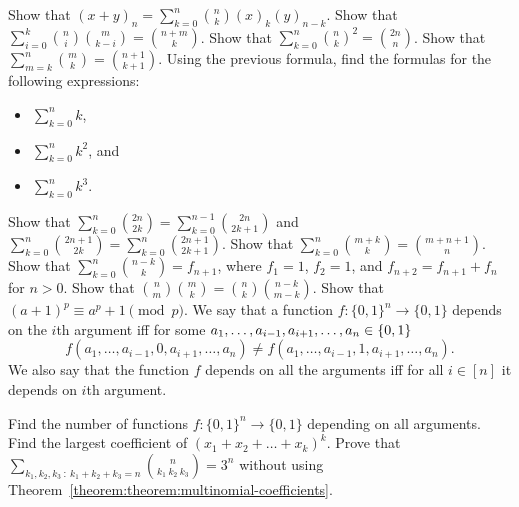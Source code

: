 \begin{chapterendexercises}
  \exercise Show that
    $(x + y)_n = \sum_{k = 0}^n \binom{n}{k} (x)_k (y)_{n - k}$.
  \exercise Show that
    $\sum_{i = 0}^k \binom{n}{i} \binom{m}{k - i} = \binom{n + m}{k}$.
  \exercise Show that
    $\sum_{k = 0}^n \binom{n}{k}^2 = \binom{2n}{n}$.
  \exercise Show that $\sum_{m = k}^n \binom{m}{k} =
    \binom{n + 1}{k + 1}$.
  \exercise Using the previous formula, find the formulas for the following
    expressions:
    \begin{itemize}
      \item $\sum_{k = 0}^n k$,
      \item $\sum_{k = 0}^n k^2$, and
      \item $\sum_{k = 0}^n k^3$.
    \end{itemize}
  \exercise Show that $\sum_{k = 0}^{n} \binom{2n}{2k} =
    \sum_{k = 0}^{n - 1} \binom{2n}{2k + 1}$ and
    $\sum_{k = 0}^{n} \binom{2n + 1}{2k} =
    \sum_{k = 0}^n \binom{2n + 1}{2k + 1}$.
  \exercise Show that $\sum_{k = 0}^n \binom{m + k}{k} =
    \binom{m + n + 1}{n}$.
  \exercise Show that $\sum_{k = 0}^n \binom{n - k}{k} = f_{n + 1}$,
    where $f_1 = 1$, $f_2 = 1$, and $f_{n + 2} = f_{n + 1} + f_n$ for $n > 0$.
  \exercise Show that $\binom{n}{m} \binom{m}{k} =
    \binom{n}{k} \binom{n - k}{m - k}$.
  \exercise Show that
    $(a + 1)^p \equiv a^p + 1 \pmod{p}$.
  \exercise We say that a function $f : \{0, 1\}^n \to \{0, 1\}$ depends on the
    $i$th argument iff for some
    $a_1, \dots, a_{i - 1}, a_{i + 1}, \dots, a_n \in \set{0, 1}$
    \[
      f(a_1, \dots, a_{i - 1}, 0, a_{i + 1}, \dots, a_n) \neq
      f(a_1, \dots, a_{i - 1}, 1, a_{i + 1}, \dots, a_n).
    \]
    We also say that the function $f$ depends on all the arguments iff for all $i
    \in [n]$ it depends on $i$th argument.

    Find the number of functions $f : \{0, 1\}^n \to \{0, 1\}$ depending on all
    arguments.
  \exercise Find the largest coefficient of $(x_1 + x_2 + \dots + x_k)^k$.
  \exercise Prove that
    $\sum_{k_1, k_2, k_3 ~:~ k_1 + k_2 + k_3 = n} \binom{n}{k_1 \ k_2 \ k_3} =
    3^n$ without using Theorem~\ref{theorem:theorem:multinomial-coefficients}.
\end{chapterendexercises}
